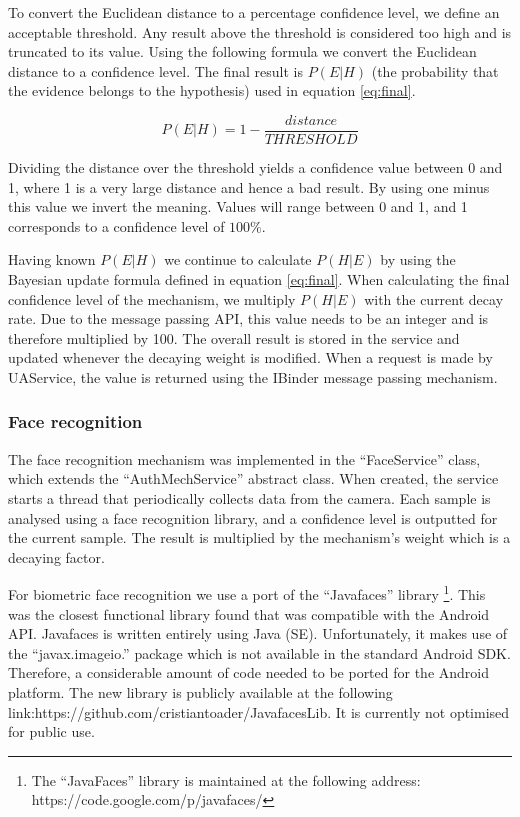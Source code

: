 To convert the Euclidean distance to a percentage confidence level, we define an acceptable threshold. Any result above the threshold is considered too high and is truncated to its value. Using the following formula we convert the Euclidean distance to a confidence level. The final result is $P(E|H)$ (the probability that the evidence belongs to the hypothesis) used in equation \ref{eq:final}.

$$P(E|H) = 1 - \frac{distance}{THRESHOLD}$$

Dividing the distance over the threshold yields a confidence value between 0 and 1, where 1 is a very large distance and hence a bad result. By using one minus this value we invert the meaning. Values will range between 0 and 1, and 1 corresponds to a confidence level of $100\%$. 

Having known $P(E|H)$ we continue to calculate $P(H|E)$ by using the Bayesian update formula defined in equation \ref{eq:final}. When calculating the final confidence level of the mechanism, we multiply $P(H|E)$ with the current decay rate. Due to the message passing API, this value needs to be an integer and is therefore multiplied by 100. The overall result is stored in the service and updated whenever the decaying weight is modified. When a request is made by UAService, the value is returned using the IBinder message passing mechanism.

\subsubsection{Face recognition}
\label{implface}
The face recognition mechanism was implemented in the ``FaceService'' class, which extends the ``AuthMechService'' abstract class. When created, the service starts a thread that periodically collects data from the camera. Each sample is analysed using a face recognition library, and a confidence level is outputted for the current sample. The result is multiplied by the mechanism's weight which is a decaying factor.

For biometric face recognition we use a port of the ``Javafaces'' library \footnote{The ``JavaFaces'' library is maintained at the following address: https://code.google.com/p/javafaces/}. This was the closest functional library found that was compatible with the Android API. Javafaces is written entirely using Java (SE). Unfortunately, it makes use of the ``javax.imageio.'' package which is not available in the standard Android SDK. Therefore, a considerable amount of code needed to be ported for the Android platform. The new library is publicly available at the following link:https://github.com/cristiantoader/JavafacesLib. It is currently not optimised for public use.

